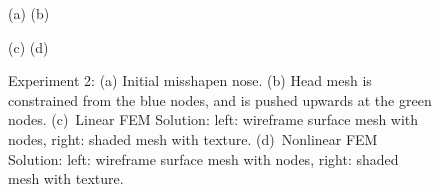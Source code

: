 \begin{figure}[b]
\centerline{
            }
\centerline{(a) \hspace*{0.45\textwidth}(b)}
\centerline{
            }
\centerline{(c) \hspace*{0.45\textwidth}(d)}
\caption{Experiment 2: (a) Initial misshapen nose. (b) Head mesh is constrained from the blue nodes, 
and is pushed upwards at the green nodes. (c)~Linear FEM Solution: left: wireframe surface mesh with nodes, 
right: shaded mesh with texture. (d)~Nonlinear FEM Solution: left: wireframe surface mesh with nodes, 
right: shaded mesh with texture.}
\label{fig:app2-2}
\end{figure}

